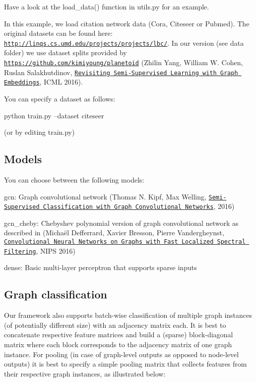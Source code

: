 Have a look at the {\ttfamily load\+\_\+data()} function in {\ttfamily utils.\+py} for an example.

In this example, we load citation network data (Cora, Citeseer or Pubmed). The original datasets can be found here\+: \href{http://linqs.cs.umd.edu/projects/projects/lbc/}{\tt http\+://linqs.\+cs.\+umd.\+edu/projects/projects/lbc/}. In our version (see {\ttfamily data} folder) we use dataset splits provided by \href{https://github.com/kimiyoung/planetoid}{\tt https\+://github.\+com/kimiyoung/planetoid} (Zhilin Yang, William W. Cohen, Ruslan Salakhutdinov, \href{https://arxiv.org/abs/1603.08861}{\tt Revisiting Semi-\/\+Supervised Learning with Graph Embeddings}, I\+C\+ML 2016).

You can specify a dataset as follows\+:


\begin{DoxyCode}
python train.py --dataset citeseer
\end{DoxyCode}


(or by editing {\ttfamily train.\+py})

\subsection*{Models}

You can choose between the following models\+:
\begin{DoxyItemize}
\item {\ttfamily gcn}\+: Graph convolutional network (Thomas N. Kipf, Max Welling, \href{http://arxiv.org/abs/1609.02907}{\tt Semi-\/\+Supervised Classification with Graph Convolutional Networks}, 2016)
\item {\ttfamily gcn\+\_\+cheby}\+: Chebyshev polynomial version of graph convolutional network as described in (Michaël Defferrard, Xavier Bresson, Pierre Vandergheynst, \href{https://arxiv.org/abs/1606.09375}{\tt Convolutional Neural Networks on Graphs with Fast Localized Spectral Filtering}, N\+I\+PS 2016)
\item {\ttfamily dense}\+: Basic multi-\/layer perceptron that supports sparse inputs
\end{DoxyItemize}

\subsection*{Graph classification}

Our framework also supports batch-\/wise classification of multiple graph instances (of potentially different size) with an adjacency matrix each. It is best to concatenate respective feature matrices and build a (sparse) block-\/diagonal matrix where each block corresponds to the adjacency matrix of one graph instance. For pooling (in case of graph-\/level outputs as opposed to node-\/level outputs) it is best to specify a simple pooling matrix that collects features from their respective graph instances, as illustrated below\+:



